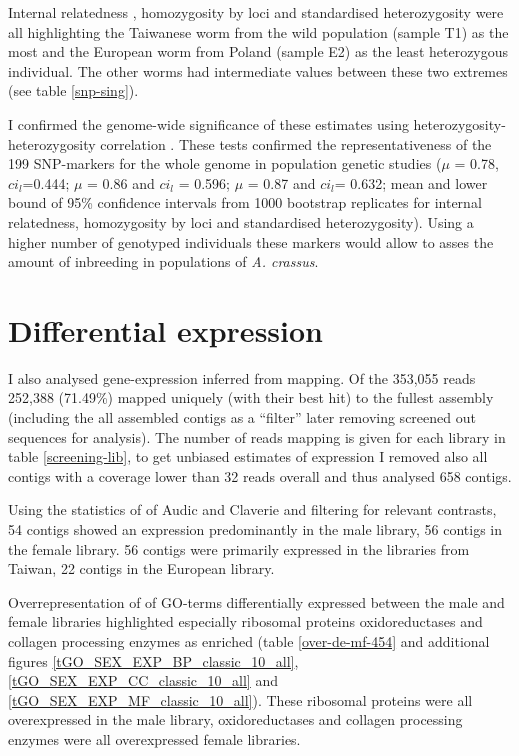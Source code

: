 Internal relatedness \cite{pmid11571049}, homozygosity by loci
\cite{pmid17107491} and standardised heterozygosity \cite{coltman81j}
were all highlighting the Taiwanese worm from the wild population
(sample T1) as the most and the European worm from Poland (sample E2)
as the least heterozygous individual. The other worms had intermediate
values between these two extremes (see table \ref{snp-sing}).

I confirmed the genome-wide significance of these estimates using
heterozygosity-heterozygosity correlation \cite{pmid21565077}. These
tests confirmed the representativeness of the 199 SNP-markers for the
whole genome in population genetic studies ($\mu$ = 0.78,
$ci_l$=0.444; $\mu$ = 0.86 and $ci_l$ = 0.596; $\mu$ = 0.87 and
$ci_l$= 0.632; mean and lower bound of 95\% confidence intervals from
1000 bootstrap replicates for internal relatedness, homozygosity by
loci and standardised heterozygosity). Using a higher number of
genotyped individuals these markers would allow to asses the amount of
inbreeding in populations of \textit{A. crassus}.


\section{Differential expression}

I also analysed gene-expression inferred from mapping. Of the 353,055
reads 252,388 (71.49\%) mapped uniquely (with their best hit) to the
fullest assembly (including the all assembled contigs as a ``filter''
later removing screened out sequences for analysis). The number of
reads mapping is given for each library in table \ref{screening-lib},
to get unbiased estimates of expression I removed also all contigs
with a coverage lower than 32 reads overall and thus analysed 658
contigs.

Using the statistics of of Audic and Claverie \cite{pmid9331369} and
filtering for relevant contrasts, 54 contigs showed an expression
predominantly in the male library, 56 contigs in the female
library. 56 contigs were primarily expressed in the libraries from
Taiwan, 22 contigs in the European library.

Overrepresentation of of GO-terms differentially expressed between the
male and female libraries highlighted especially ribosomal proteins
oxidoreductases and collagen processing enzymes as enriched
(table \ref{over-de-mf-454} and additional figures
\ref{tGO_SEX_EXP_BP_classic_10_all},
\ref{tGO_SEX_EXP_CC_classic_10_all} and
\ref{tGO_SEX_EXP_MF_classic_10_all}). These ribosomal proteins were
all overexpressed in the male library, oxidoreductases and collagen
processing enzymes were all overexpressed female libraries.

